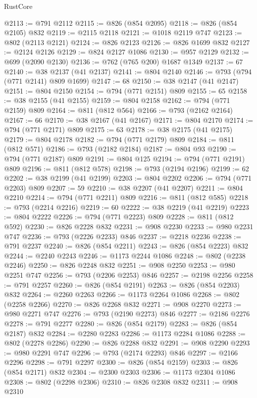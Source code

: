 \begin{lexlean}{RustCore}
\begin{coremodule}
@2113 := @791 @2112
@2115 := @826 (@854 @2095)
@2118 := @826 (@854 @2105) @832
@2119 := @2115 @2118
@2121 := @1018 @2119 @747
@2123 := @802 (@2113 @2121)
@2124 := @826 @2123
@2126 := @826 @1699 @832
@2127 := @2124 @2126
@2129 := @824 @2127 @1086
@2130 := @957 @2129
@2132 := @699 (@2090 @2130)
@2136 := @762 (@765 @200) @1687 @1349
@2137 := 67
@2140 := @38 @2137 (@41 @2137)
@2141 := @804 @2140
@2146 := @793 (@794 (@771 @2141) @809 @1699)
@2147 := 68
@2150 := @38 @2147 (@41 @2147)
@2151 := @804 @2150
@2154 := @794 (@771 @2151) @809
@2155 := 65
@2158 := @38 @2155 (@41 @2155)
@2159 := @804 @2158
@2162 := @794 (@771 @2159) @809
@2164 := @811 (@812 @564)
@2166 := @793 (@2162 @2164)
@2167 := 66
@2170 := @38 @2167 (@41 @2167)
@2171 := @804 @2170
@2174 := @794 (@771 @2171) @809
@2175 := 63
@2178 := @38 @2175 (@41 @2175)
@2179 := @804 @2178
@2182 := @794 (@771 @2179) @809
@2184 := @811 (@812 @571)
@2186 := @793 (@2182 @2184)
@2187 := @804 @93
@2190 := @794 (@771 @2187) @809
@2191 := @804 @125
@2194 := @794 (@771 @2191) @809
@2196 := @811 (@812 @578)
@2198 := @793 (@2194 @2196)
@2199 := 62
@2202 := @38 @2199 (@41 @2199)
@2203 := @804 @2202
@2206 := @794 (@771 @2203) @809
@2207 := 59
@2210 := @38 @2207 (@41 @2207)
@2211 := @804 @2210
@2214 := @794 (@771 @2211) @809
@2216 := @811 (@812 @585)
@2218 := @793 (@2214 @2216)
@2219 := 60
@2222 := @38 @2219 (@41 @2219)
@2223 := @804 @2222
@2226 := @794 (@771 @2223) @809
@2228 := @811 (@812 @592)
@2230 := @826 @2228 @832
@2231 := @908 @2230
@2233 := @980 @2231 @747
@2236 := @793 (@2226 @2233) @846
@2237 := @2218 @2236
@2238 := @791 @2237
@2240 := @826 (@854 @2211)
@2243 := @826 (@854 @2223) @832
@2244 := @2240 @2243
@2246 := @1173 @2244 @1086
@2248 := @802 (@2238 @2246)
@2250 := @826 @2248 @832
@2251 := @908 @2250
@2253 := @980 @2251 @747
@2256 := @793 (@2206 @2253) @846
@2257 := @2198 @2256
@2258 := @791 @2257
@2260 := @826 (@854 @2191)
@2263 := @826 (@854 @2203) @832
@2264 := @2260 @2263
@2266 := @1173 @2264 @1086
@2268 := @802 (@2258 @2266)
@2270 := @826 @2268 @832
@2271 := @908 @2270
@2273 := @980 @2271 @747
@2276 := @793 (@2190 @2273) @846
@2277 := @2186 @2276
@2278 := @791 @2277
@2280 := @826 (@854 @2179)
@2283 := @826 (@854 @2187) @832
@2284 := @2280 @2283
@2286 := @1173 @2284 @1086
@2288 := @802 (@2278 @2286)
@2290 := @826 @2288 @832
@2291 := @908 @2290
@2293 := @980 @2291 @747
@2296 := @793 (@2174 @2293) @846
@2297 := @2166 @2296
@2298 := @791 @2297
@2300 := @826 (@854 @2159)
@2303 := @826 (@854 @2171) @832
@2304 := @2300 @2303
@2306 := @1173 @2304 @1086
@2308 := @802 (@2298 @2306)
@2310 := @826 @2308 @832
@2311 := @908 @2310

\end{coremodule}
\end{lexlean}
